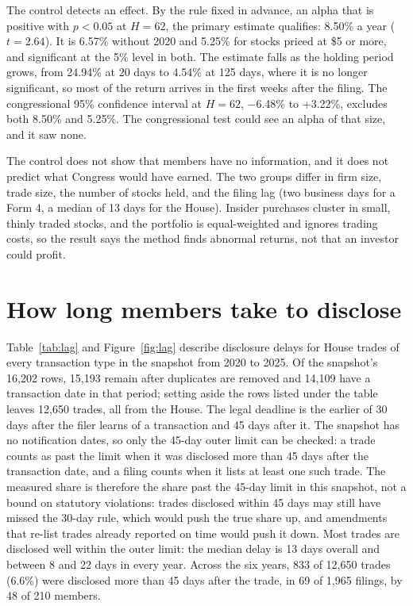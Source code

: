 \documentclass[11pt]{article}
\newcommand{\m}{\ensuremath{-}}
\begin{document}
The control detects an effect. By the rule fixed in advance, an alpha that is positive with $p < 0.05$ at $H = 62$, the primary estimate qualifies: 8.50\% a year ($t = 2.64$). It is 6.57\% without 2020 and 5.25\% for stocks priced at \$5 or more, and significant at the 5\% level in both. The estimate falls as the holding period grows, from 24.94\% at 20 days to 4.54\% at 125 days, where it is no longer significant, so most of the return arrives in the first weeks after the filing. The congressional 95\% confidence interval at $H = 62$, \m6.48\% to +3.22\%, excludes both 8.50\% and 5.25\%. The congressional test could see an alpha of that size, and it saw none.

The control does not show that members have no information, and it does not predict what Congress would have earned. The two groups differ in firm size, trade size, the number of stocks held, and the filing lag (two business days for a Form 4, a median of 13 days for the House). Insider purchases cluster in small, thinly traded stocks, and the portfolio is equal-weighted and ignores trading costs, so the result says the method finds abnormal returns, not that an investor could profit.

\section{How long members take to disclose}\label{sec:lag}

Table~\ref{tab:lag} and Figure~\ref{fig:lag} describe disclosure delays for House trades of every transaction type in the snapshot from 2020 to 2025. Of the snapshot's 16,202 rows, 15,193 remain after duplicates are removed and 14,109 have a transaction date in that period; setting aside the rows listed under the table leaves 12,650 trades, all from the House. The legal deadline is the earlier of 30 days after the filer learns of a transaction and 45 days after it. The snapshot has no notification dates, so only the 45-day outer limit can be checked: a trade counts as past the limit when it was disclosed more than 45 days after the transaction date, and a filing counts when it lists at least one such trade. The measured share is therefore the share past the 45-day limit in this snapshot, not a bound on statutory violations: trades disclosed within 45 days may still have missed the 30-day rule, which would push the true share up, and amendments that re-list trades already reported on time would push it down. Most trades are disclosed well within the outer limit: the median delay is 13 days overall and between 8 and 22 days in every year. Across the six years, 833 of 12,650 trades (6.6\%) were disclosed more than 45 days after the trade, in 69 of 1,965 filings, by 48 of 210 members.
\end{document}
